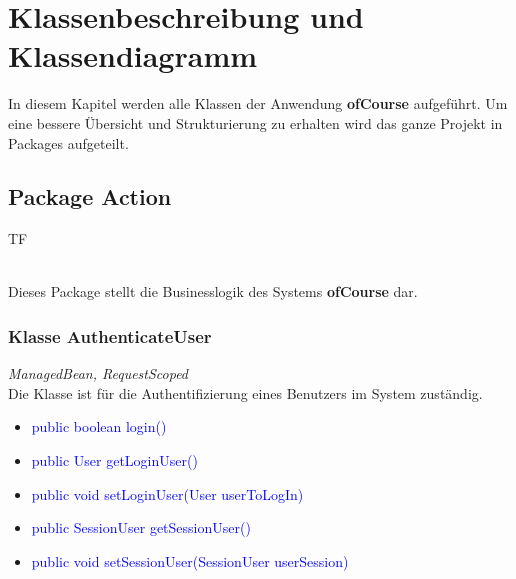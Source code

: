 \documentclass[a4paper]{scrreprt}
\begin{document}
	
	\newcommand{\class}[1]{\paragraph{Klasse #1:}\ \\ }
	\newcommand{\method}[1]{\textcolor{blue}{#1}}
	\newcommand{\kursiv}[1]{{\it #1}}
	\newcommand{\override}{{\it @Override}\ \\}
	
	\chapter{Klassenbeschreibung und Klassendiagramm}
	In diesem Kapitel werden alle Klassen der Anwendung \textbf{ofCourse} aufgeführt.
	Um eine bessere Übersicht und Strukturierung zu erhalten wird das ganze Projekt in Packages aufgeteilt.
	
	\section{Package Action}
	\begin{tiny}
		TF\\
	\end{tiny}\\
	Dieses Package stellt die Businesslogik des Systems \textbf{ofCourse} dar.
	\subsection{Klasse AuthenticateUser}
	\kursiv{ManagedBean, RequestScoped}\\
	Die Klasse ist für die Authentifizierung eines Benutzers im System zuständig.
	\begin{itemize}
		\item \method{public boolean login()}
		\item \method{public User getLoginUser()}
		\item \method{public void setLoginUser(User userToLogIn)}
		\item \method{public SessionUser getSessionUser()}
		\item \method{public void setSessionUser(SessionUser userSession)}
	\end{itemize}
	
\end{document}
